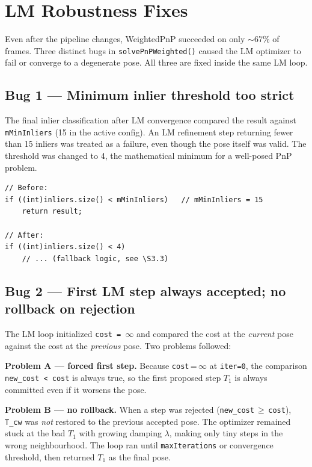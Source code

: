 \documentclass[12pt,a4paper]{article}
\begin{document}
\section{LM Robustness Fixes}

Even after the pipeline changes, WeightedPnP succeeded on only $\sim$67\% of frames.
Three distinct bugs in \texttt{solvePnPWeighted()} caused the LM optimizer to fail or
converge to a degenerate pose. All three are fixed inside the same LM loop.

\subsection{Bug 1 — Minimum inlier threshold too strict}

The final inlier classification after LM convergence compared the result against
\texttt{mMinInliers} (15 in the active config). An LM refinement step returning
fewer than 15 inliers was treated as a failure, even though the pose itself was
valid. The threshold was changed to 4, the mathematical minimum for a well-posed
PnP problem.

\begin{lstlisting}[style=cpp,
  caption={Threshold corrected in \texttt{solvePnPWeighted()}}]
// Before:
if ((int)inliers.size() < mMinInliers)   // mMinInliers = 15
    return result;

// After:
if ((int)inliers.size() < 4)
    // ... (fallback logic, see \S3.3)
\end{lstlisting}

\subsection{Bug 2 — First LM step always accepted; no rollback on rejection}

The LM loop initialized \texttt{cost = }\(\infty\) and compared the cost at the
\emph{current} pose against the cost at the \emph{previous} pose. Two problems
followed:

\begin{warningbox}
\textbf{Problem A — forced first step.} Because \texttt{cost}\,=\,$\infty$ at
\texttt{iter=0}, the comparison \texttt{new\_cost < cost} is always true, so the
first proposed step $T_1$ is always committed even if it worsens the pose.

\textbf{Problem B — no rollback.} When a step was rejected
(\texttt{new\_cost}\,$\geq$\,\texttt{cost}), \texttt{T\_cw} was \emph{not} restored
to the previous accepted pose. The optimizer remained stuck at the bad $T_1$ with
growing damping $\lambda$, making only tiny steps in the wrong neighbourhood. The
loop ran until \texttt{maxIterations} or convergence threshold, then returned
$T_1$ as the final pose.
\end{warningbox}
\end{document}
